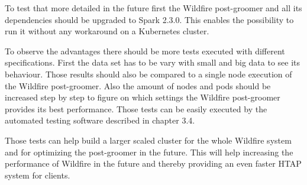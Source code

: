 To test that more detailed in the future first the Wildfire post-groomer and all its dependencies should be upgraded to Spark 2.3.0. This enables the possibility to run it without any workaround on a Kubernetes cluster.

To observe the advantages there should be more tests executed with different specifications. First the data set has to be vary with small and big data to see its behaviour. Those results should also be compared to a single node execution of the Wildfire post-groomer. Also the amount of nodes and pods should be increased step by step to figure on which settings the Wildfire post-groomer provides its best performance. Those tests can be easily executed by the automated testing software described in chapter 3.4.

Those tests can help build a larger scaled cluster for the whole Wildfire system and for optimizing the post-groomer in the future. This will help increasing the performance of Wildfire in the future and thereby providing an even faster HTAP system for clients.